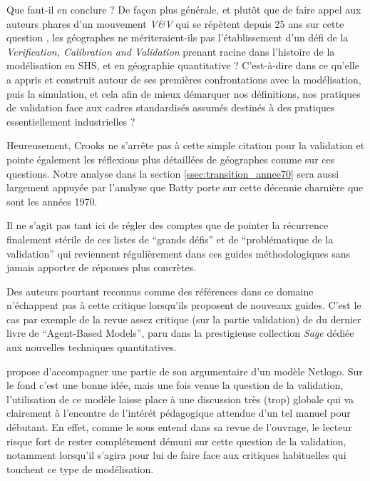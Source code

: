 Que faut-il en conclure ? De façon plus générale, et plutôt que de faire appel aux auteurs phares d'un mouvement \textit{V\&V} qui se répètent depuis 25 ans sur cette question \autocite{Sargent1983, Sargent2010}, les géographes ne mériteraient-ils pas l'établissement d'un défi de la \textit{Verification, Calibration and Validation} prenant racine dans l'histoire de la modélisation en SHS, et en géographie quantitative ? C'est-à-dire dans ce qu'elle a appris et construit autour de ses premières confrontations avec la modélisation, puis la simulation, et cela afin de mieux démarquer nos définitions, nos pratiques de validation face aux cadres standardisés assumés destinés à des pratiques essentiellement industrielles ?

Heureusement, Crooks ne s'arrête pas à cette simple citation pour la validation et pointe également les réflexions plus détaillées de géographes comme \textcites{Batty2001, Batty2005b} sur ces questions. Notre analyse dans la section \ref{ssec:transition_annee70} sera aussi largement appuyée par l'analyse que Batty porte sur cette décennie charnière que sont les années 1970.

Il ne s'agit pas tant ici de régler des comptes que de pointer la récurrence finalement stérile de ces listes de \enquote{grands défis} et de \enquote{problématique de la validation} qui reviennent régulièrement dans ces guides méthodologiques sans jamais apporter de réponses plus concrètes.

Des auteurs pourtant reconnus comme des références dans ce domaine n'échappent pas à cette critique lorsqu'ils proposent de nouveaux guides. C'est le cas par exemple de la revue assez critique (sur la partie validation) de \textcite{Manzo2007a} du dernier livre de \textcite{Gilbert2008} \foreignquote{english}{Agent-Based Models}, paru dans la prestigieuse collection \textit{Sage} dédiée aux nouvelles techniques quantitatives.

\textcite{Gilbert2008} propose d'accompagner une partie de son argumentaire d'un modèle Netlogo. Sur le fond c'est une bonne idée, mais une fois venue la question de la validation, l'utilisation de ce modèle laisse place à une discussion très (trop) globale qui va clairement à l'encontre de l'intérét pédagogique attendue d'un tel manuel pour débutant. En effet, comme le sous entend \textcite{Manzo2007a} dans sa revue de l'ouvrage, le lecteur risque fort de rester complétement démuni sur cette question de la validation, notamment lorsqu'il s'agira pour lui de faire face aux critiques habituelles qui touchent ce type de modélisation.

